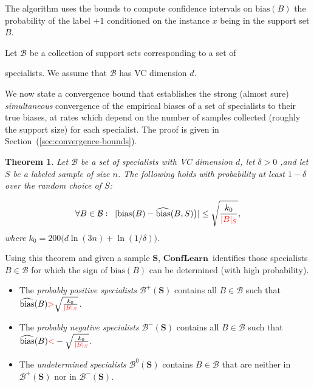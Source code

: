 \documentclass{article}
\newtheorem{theorem}{Theorem}[section]
\newcommand{\cB}{\mathcal{B}}
\newcommand{\cX}{\mathcal{X}}
\newcommand{\bias}{\text{bias}}
\newcommand{\ebias}{\widehat{\text{bias}}}
\newcommand{\new}[1]{\textcolor{red}{#1}}
\newcommand{\ActiveLearn}{$\mathbf{ConfLearn}$}
\newcommand{\samp}{S}
\newcommand{\comment}[3]{\marginpar{\textcolor{#2}{#1: #3}}}
\newcommand{\yoav}[1]{\comment{Yoav}{blue}{#1}}
\newcommand{\akshay}[1]{\comment{Akshay}{orange}{#1}}
\begin{document}
The algorithm uses the bounds to compute confidence
intervals on $\bias(B)$ the probability of the label $+1$
conditioned on the instance $x$ being in the support set $B$.
\fi

Let $\cB$ be a collection of support sets corresponding to a set of

specialists. We assume that $\cB$ has VC dimension $d$. 

We now state a convergence bound that establishes the strong (almost sure) \emph{simultaneous} convergence 
of the empirical biases of a set of specialists to their true biases, 
at rates which depend on the number of samples collected (roughly the support size) for each specialist.
The proof is given in Section~(\ref{sec:convergence-bounds}).



\begin{theorem}\label{thm:UCECM}
Let $\cB$ be a set of specialists with VC dimension $d$, let
$\delta>0$ ,and let $\samp$ be a labeled sample of size $n$.  The
following holds with probability at least $1-\delta$ over the random
choice of $\samp$:

\[\forall B\in\cB :\;\;
\lvert \bias(B) - \ebias(B,\samp) \bigr) \rvert
\leq \sqrt{\frac{k_0}{\new{\lvert B\rvert_S}}},
\]
where $k_0 =200\bigl(d\ln(3n) + \ln(1/\delta)\bigr)$.
\end{theorem}


\newcommand{\set}{G}
\newcommand{\sample}[1]{{\mathbf #1}}
\newcommand{\constr}[3]{#1 \left(#2,\sample{#3}\right)}
  
Using this theorem and given a sample $\sample{S}$, 
\ActiveLearn\ identifies those specialists $B \in \cB$ for which the sign of
$\bias(B)$ can be determined (with high probability). 
\begin{itemize}
\item The \emph{probably positive specialists} $\cB^{+} (\sample{S})$ contains all $B \in \cB$ such that
  $\ebias(B) \new{>} \sqrt{\frac{k_0}{\new{\lvert B\rvert_S}}}$.
\item The \emph{probably negative specialists} $\cB^{-} (\sample{S})$ contains all $B \in \cB$ such that
  $\ebias(B) \new{<} -\sqrt{\frac{k_0}{\new{\lvert B\rvert_S}}}$.
\item The \emph{undetermined specialists} $\cB^{0} (\sample{S})$ contains $B \in \cB$ that are neither in
  $\cB^{+} (\sample{S})$ nor in $\cB^{-} (\sample{S})$.
\end{itemize}
\end{document}
